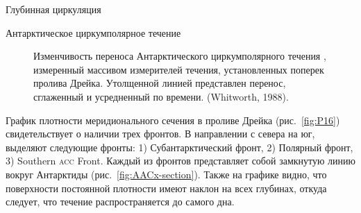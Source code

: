 \begin{chapter}{Глубинная циркуляция}
\begin{section}{Антарктическое циркумполярное течение}
\begin{figure}[b!]
\caption{Изменчивость переноса%
Антарктического циркумполярного течения%
, измеренный массивом
измерителей течения, установленных поперек пролива Дрейка. 
Утолщенной линией представлен перенос, сглаженный и усредненный по времени.
(Whitworth, 1988).}
\label{fig:aacxport}
\end{figure}
%
%

График плотности меридионального сечения в проливе Дрейка (рис.~\ref{fig:P16})
свидетельствует о наличии трех фронтов. В направлении с севера на юг, 
выделяют следующие фронты: 1) Субантарктический фронт, 
2) Полярный фронт, 3) Southern \textsc{acc} Front. 
Каждый из фронтов представляет собой замкнутую линию вокруг Антарктиды
(рис.~\ref{fig:AACx-section}). Также на графике видно, что поверхности 
постоянной плотности имеют наклон на всех глубинах, откуда следует,
что течение распространяется до самого дна.
%


\end{section}
\end{chapter}
